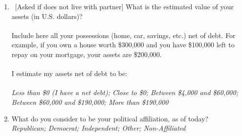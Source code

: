 \begin{enumerate}[resume]
\item ~[Asked if does not live with partner] What is the estimated value of your assets (in U.S. dollars)?   \\
   \\
Include here all your possessions (home, car, savings, etc.) net of debt. For example, if you own a house worth \$300,000 and you have \$100,000 left to repay on your mortgage, your assets are \$200,000.  \\
  \\
  I estimate my assets net of debt to be: \\%
\\  \textit{Less than \$0 (I have a net debt); Close to \$0; Between \$4,000 and \$60,000; Between \$60,000 and \$190,000; More than \$190,000}
\item What do you consider to be your political affiliation, as of today?
\\ \textit{Republican; Democrat; Independent; Other; Non-Affiliated}
\end{enumerate}

